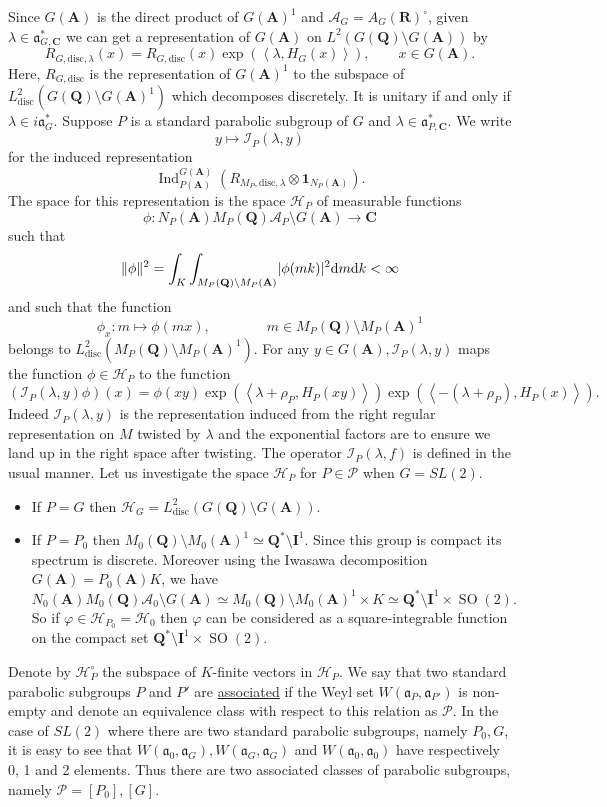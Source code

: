 \documentclass[11pt]{amsart}
\def\A{\mathbf A}
\def\C{\mathbf C}
\def\I{\mathbf I}
\def\Q{\mathbf Q}
\def\R{\mathbf R}
\def\AAA{\mathcal A}	%
\def\HHH{\mathcal H}
\def\III{\mathcal I}
\def\PPP{\mathcal P}
\def\aaa{\mathfrak a}
\def\d{\text d}
\def\bs{\setminus}
\def\disc{\text{disc}}
\def\Ind{\operatorname{Ind}}
\def\Ltwo{L^2}
\def\mod#1{\lvert #1 \rvert} %
\def\norm#1{\Vert #1 \Vert} %
\def\sprod#1#2{\left\langle #1 , #2 \right\rangle}  %
\theoremstyle{remark}
\begin{document}
Since $G(\A)$ is the direct product of $G(\A)^1$ and $\AAA_G = A_G(\R)^\circ$, given $\lambda \in \aaa_{G, \C}^*$ we can get a representation of $G(\A)$ on $\Ltwo(G(\Q) \bs G(\A))$ by
\[ R_{G, \disc, \lambda}(x) = R_{G, \disc}(x) \exp(\sprod{\lambda}{H_G(x)}), \qquad x \in G(\A). \]
Here, $R_{G, \disc}$ is the representation of $G(\A)^1$ to the subspace of $\Ltwo_\disc(G(\Q)\bs G(\A)^1)$ which decomposes discretely. It is unitary if and only if $\lambda \in i\aaa_G^*$. Suppose $P$ is a standard parabolic subgroup of $G$ and $\lambda \in \aaa_{P, \C}^*$. We write 
\[ y \mapsto \III_P(\lambda, y) \]
for the induced representation 
\[ \Ind_{P(\A)}^{G(\A)}(R_{M_P, \disc, \lambda} \otimes \mathbf 1_{N_P(\A)}). \]
The space for this representation is the space $\HHH_P$ of measurable functions
\[ \phi : N_P(\A)M_P(\Q)\AAA_P \bs G(\A) \to \C \]
such that 
\[ \norm{\phi}^2 = \int_K \int_{M_P(\Q)\bs M_P(\A)} \mod{\phi(mk)}^2 \d m \d k < \infty \]
and such that the function
\[ \phi_x : m \mapsto \phi(mx), \qquad \qquad m \in M_P(\Q)\bs M_P(\A)^1 \]
belongs to $\Ltwo_\disc(M_P(\Q) \bs M_P(\A)^1)$.
For any $y \in G(\A), \III_P(\lambda, y)$ maps the function $\phi \in \HHH_P$ to the function
\[ (\III_P(\lambda, y)\phi)(x) = \phi(xy) \exp(\sprod{\lambda + \rho_P}{H_P(xy)}) 
		\exp(\sprod{-(\lambda + \rho_P)}{H_P(x)}). \]
Indeed $\III_P(\lambda, y)$ is the representation induced from the right regular representation on $M$ twisted by $\lambda$ and the exponential factors are to ensure we land up in the right space after twisting. The operator $\III_P(\lambda, f)$ is defined in the usual manner. Let us investigate the space $\HHH_P$ for $P \in \PPP$ when $G = SL(2)$. 
\begin{itemize}
	\item If $P=G$ then $\HHH_G = \Ltwo_{\disc}(G(\Q)\bs G(\A))$. 
	\item If $P = P_0$ then $M_0(\Q)\bs M_0(\A)^1 \simeq \Q^* \bs \I^1$. 
		Since this group is compact its spectrum is discrete. Moreover using the Iwasawa decomposition $G(\A) = P_0(\A) K$, we have
		\[ N_0(\A)M_0(\Q)\AAA_0\bs G(\A) \simeq M_0(\Q)\bs M_0(\A)^1 \times K \simeq \Q^*\bs \I^1 \times \operatorname{SO}(2). \]
		So if $\varphi \in \HHH_{P_0} = \HHH_0$ then $\varphi$ can be considered as a square-integrable function on the compact set $\Q^*\bs \I^1 \times \operatorname{SO}(2)$. 
\end{itemize}

Denote by $\HHH_P^\circ$ the subspace of $K$-finite vectors in $\HHH_P$. We say that two standard parabolic subgroups $P$ and $P'$ are \underline{associated} if the Weyl set $W(\aaa_P, \aaa_{P'})$ is non-empty and denote an equivalence class with respect to this relation as $\PPP$. In the case of $SL(2)$ where there are two standard parabolic subgroups, namely $P_0, G$, it is easy to see that $W(\aaa_0, \aaa_G), W(\aaa_G, \aaa_G)$ and $W(\aaa_0, \aaa_0)$ have respectively 0, 1 and 2 elements. Thus there are two associated classes of parabolic subgroups, namely $\PPP = [P_0], [G]$. 
\end{document}
